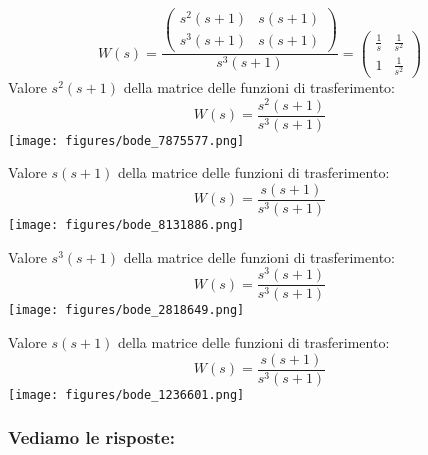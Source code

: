 \documentclass{article}
\begin{document}
\[ W(s)  =  \frac{\left(\begin{matrix}s^{2} \left(s + 1\right) & s \left(s + 1\right)\\s^{3} \left(s + 1\right) & s \left(s + 1\right)\end{matrix}\right)}{s^{3} \left(s + 1\right)} = \left(\begin{matrix}\frac{1}{s} & \frac{1}{s^{2}}\\1 & \frac{1}{s^{2}}\end{matrix}\right)  \] 
Valore $ s^{2} \left(s + 1\right) $ della matrice delle funzioni di trasferimento:
\[ W(s) = \frac{s^{2} \left(s + 1\right)}{s^{3} \left(s + 1\right)} \]\texttt{[image: figures/bode\_7875577.png]}


Valore $ s \left(s + 1\right) $ della matrice delle funzioni di trasferimento:
\[ W(s) = \frac{s \left(s + 1\right)}{s^{3} \left(s + 1\right)} \]\texttt{[image: figures/bode\_8131886.png]}


Valore $ s^{3} \left(s + 1\right) $ della matrice delle funzioni di trasferimento:
\[ W(s) = \frac{s^{3} \left(s + 1\right)}{s^{3} \left(s + 1\right)} \]\texttt{[image: figures/bode\_2818649.png]}


Valore $ s \left(s + 1\right) $ della matrice delle funzioni di trasferimento:
\[ W(s) = \frac{s \left(s + 1\right)}{s^{3} \left(s + 1\right)} \]\texttt{[image: figures/bode\_1236601.png]}


\subsubsection{Vediamo le risposte:} 
\end{document}
